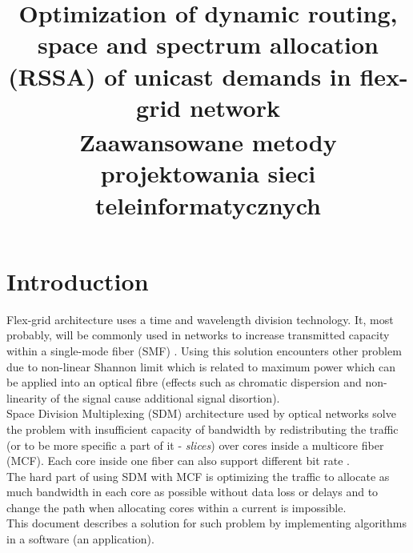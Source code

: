 \documentclass[conference]{IEEEtran}
\begin{document}
\title{Optimization of dynamic routing, space and spectrum allocation
(RSSA) of unicast demands in flex-grid network\\
{\footnotesize \textsuperscript{} Zaawansowane metody projektowania sieci teleinformatycznych}
}

\author{
\and
{}
}

\maketitle

\section{Introduction}
Flex-grid architecture uses a time and wavelength division technology. It, most probably, will be commonly used in networks to increase transmitted capacity within a single-mode fiber (SMF) \cite{sdm-walko}. Using this solution encounters other problem due to non-linear Shannon limit which is related to maximum power which can be applied into an optical fibre (effects such as chromatic dispersion and non-linearity of the signal cause additional signal disortion)\cite{shannon}.
\\
Space Division Multiplexing (SDM) architecture used by optical networks solve the problem with insufficient capacity of bandwidth by redistributing the traffic (or to be more specific a part of it - \textit{slices}) over cores inside a multicore fiber (MCF). Each core inside one fiber can also support different bit rate \cite{flex-intro}.
\\
The hard part of using SDM with MCF is optimizing the traffic to allocate as much bandwidth in each core as possible without data loss or delays and to change the path when allocating cores within a current is impossible.
\\
This document describes a solution for such problem by implementing algorithms in a software (an application). 
\\
\end{document}
